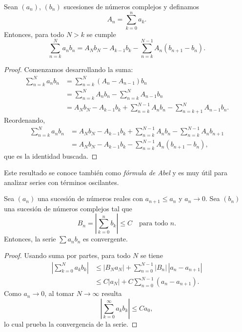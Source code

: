 \begin{proposition}
    Sean $(a_n)$, $(b_n)$ sucesiones de números complejos y definamos
    \begin{equation*}
        A_n = \sum_{k=0}^n a_k.
    \end{equation*}
    Entonces, para todo $N>k$ se cumple
    \begin{equation*}
        \sum_{n=k}^N a_n b_n
        = A_N b_N - A_{k-1} b_k - \sum_{n=k}^{N-1} A_n (b_{n+1}-b_n).
    \end{equation*}
\end{proposition}

\begin{proof}
    Comenzamos desarrollando la suma:
    \begin{align*}
        \sum_{n=k}^N a_n b_n
        &= \sum_{n=k}^N (A_n - A_{n-1}) b_n \\
        &= \sum_{n=k}^N A_n b_n - \sum_{n=k}^N A_{n-1} b_n \\
        &= A_N b_N - A_{k-1} b_k + \sum_{n=k}^{N-1} A_n b_n - \sum_{n=k+1}^N A_{n-1} b_n.
    \end{align*}
    Reordenando,
    \begin{align*}
        \sum_{n=k}^N a_n b_n
        &= A_N b_N - A_{k-1} b_k + \sum_{n=k}^{N-1} A_n b_n - \sum_{n=k}^{N-1} A_n b_{n+1} \\
        &= A_N b_N - A_{k-1} b_k - \sum_{n=k}^{N-1} A_n (b_{n+1}-b_n),
    \end{align*}
    que es la identidad buscada.
\end{proof}

Este resultado se conoce también como \textit{fórmula de Abel} y es muy útil para analizar series con términos oscilantes.  

\begin{proposition}
    Sea $(a_n)$ una sucesión de números reales con $a_{n+1} \leq a_n$ y $a_n \to 0$.  
    Sea $(b_n)$ una sucesión de números complejos tal que
    \begin{equation*}
        B_n = \left|\sum_{k=0}^n b_k\right| \leq C \quad \text{para todo } n.
    \end{equation*}
    Entonces, la serie $\sum a_n b_n$ es convergente.
\end{proposition}

\begin{proof}
    Usando suma por partes, para todo $N$ se tiene
    \begin{align*}
        \left|\sum_{k=0}^N a_k b_k\right|
        &\leq |B_N a_N| + \sum_{n=0}^{N-1} |B_n|\,|a_n - a_{n+1}| \\
        &\leq C|a_N| + C \sum_{n=0}^{N-1} (a_n - a_{n+1}).
    \end{align*}
    Como $a_n \to 0$, al tomar $N \to \infty$ resulta
    \begin{equation*}
        \left|\sum_{k=0}^\infty a_k b_k\right| \leq C a_0,
    \end{equation*}
    lo cual prueba la convergencia de la serie.
\end{proof}

